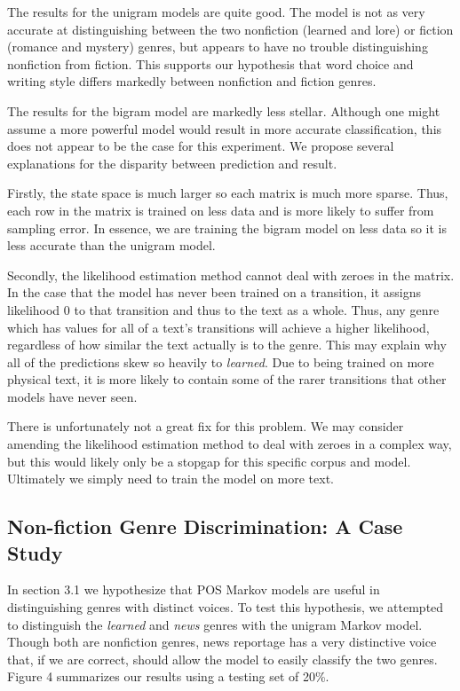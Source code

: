 \documentclass{article}
\begin{document}
The results for the unigram models are quite good. The model is not as very accurate at distinguishing between the two nonfiction (learned and lore) or fiction (romance and mystery) genres, but appears to have no trouble distinguishing nonfiction from fiction. This supports our hypothesis that word choice and writing style differs markedly between nonfiction and fiction genres.

The results for the bigram model are markedly less stellar. Although one might assume a more powerful model would result in more accurate classification, this does not appear to be the case for this experiment. We propose several explanations for the disparity between prediction and result.

Firstly, the state space is much larger so each matrix is much more sparse. Thus, each row in the matrix is trained on less data and is more likely to suffer from sampling error. In essence, we are training the bigram model on less data so it is less accurate than the unigram model.

Secondly, the likelihood estimation method cannot deal with zeroes in the matrix. In the case that the model has never been trained on a transition, it assigns likelihood 0 to that transition and thus to the text as a whole. Thus, any genre which has values for all of a text's transitions will achieve a higher likelihood, regardless of how similar the text actually is to the genre. This may explain why all of the predictions skew so heavily to \textit{learned}. Due to being trained on more physical text, it is more likely to contain some of the rarer transitions that other models have never seen.

There is unfortunately not a great fix for this problem. We may consider amending the likelihood estimation method to deal with zeroes in a complex way, but this would likely only be a stopgap for this specific corpus and model. Ultimately we simply need to train the model on more text.

\subsection{Non-fiction Genre Discrimination: A Case Study}
In section 3.1 we hypothesize that POS Markov models are useful in distinguishing genres with distinct voices. To test this hypothesis, we attempted to distinguish the \textit{learned} and \textit{news} genres with the unigram Markov model. Though both are nonfiction genres, news reportage has a very distinctive voice that, if we are correct, should allow the model to easily classify the two genres. Figure 4 summarizes our results using a testing set of 20\%.
\end{document}
